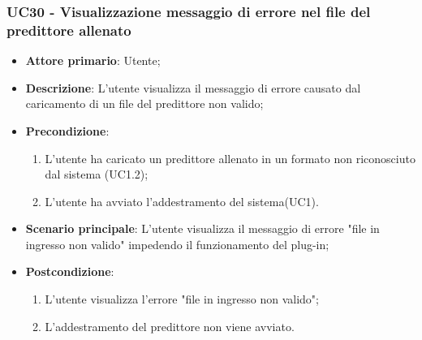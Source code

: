 \subsubsection{UC30 - Visualizzazione messaggio di errore nel file del predittore allenato}
\label{sssec:uc30}
\begin{itemize}
  \item \textbf{Attore primario}: Utente;
  \item \textbf{Descrizione}: L'utente visualizza il messaggio di errore causato dal caricamento di un file del predittore non valido;
  \item \textbf{Precondizione}:
  \begin{enumerate}
		\item L'utente ha caricato un predittore allenato in un formato non riconosciuto dal sistema (UC1.2);
		\item L'utente ha avviato l'addestramento del sistema(UC1).
	\end{enumerate}
  \item \textbf{Scenario principale}: L'utente visualizza il messaggio di errore "file in ingresso non valido" impedendo il funzionamento del plug-in;
  \item \textbf{Postcondizione}:
  \begin{enumerate}
		\item L'utente visualizza l'errore "file in ingresso non valido";
		\item L'addestramento del predittore non viene avviato.
	\end{enumerate}
\end{itemize}
